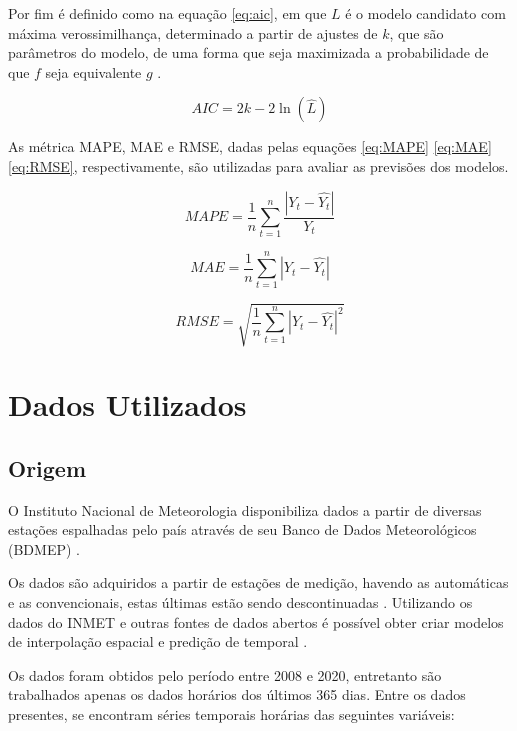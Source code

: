 Por fim é definido como na equação \ref{eq:aic}, em que $L$ é o modelo candidato com máxima verossimilhança, determinado a partir de ajustes de $k$, que são parâmetros do modelo, de uma forma que seja maximizada a probabilidade de que $f$ seja equivalente $g$ \cite{wagenmakers2004aic}.

\begin{equation}
\label{eq:aic}
    AIC = 2k - 2\ln(\hat L)
\end{equation}

As métrica MAPE, MAE e RMSE, dadas pelas equações \ref{eq:MAPE} \ref{eq:MAE} \ref{eq:RMSE}, respectivamente, são utilizadas para avaliar as previsões dos modelos. 

\begin{equation}
\label{eq:MAPE}
    MAPE = \frac{1}{n}\sum_{t=1}^{n} \frac{|Y_t - \hat{Y_t}|}{Y_t}
\end{equation}

\begin{equation}
\label{eq:MAE}
    MAE = \frac{1}{n}\sum_{t=1}^{n} |Y_t - \hat{Y_t}|
\end{equation}

\begin{equation}
\label{eq:RMSE}
    RMSE = \sqrt{\frac{1}{n}\sum_{t=1}^{n} |Y_t - \hat{Y_t}|^2}
\end{equation}

\section{Dados Utilizados} 
\label{cap:dados_prep}

\subsection{Origem}

O Instituto Nacional de Meteorologia disponibiliza dados a partir de diversas estações espalhadas pelo país através de seu Banco de Dados Meteorológicos (BDMEP) \cite{INMET}.

Os dados são adquiridos a partir de estações de medição, havendo as automáticas e as convencionais, estas últimas estão sendo descontinuadas \cite{lima2020comparaccao}. Utilizando os dados do INMET e outras fontes de dados abertos é possível obter criar modelos de interpolação espacial e predição de temporal \cite{mendes2020integraccao}.

Os dados foram obtidos pelo período entre 2008 e 2020, entretanto são trabalhados apenas os dados horários dos últimos 365 dias. Entre os dados presentes, se encontram séries temporais horárias das seguintes variáveis:

